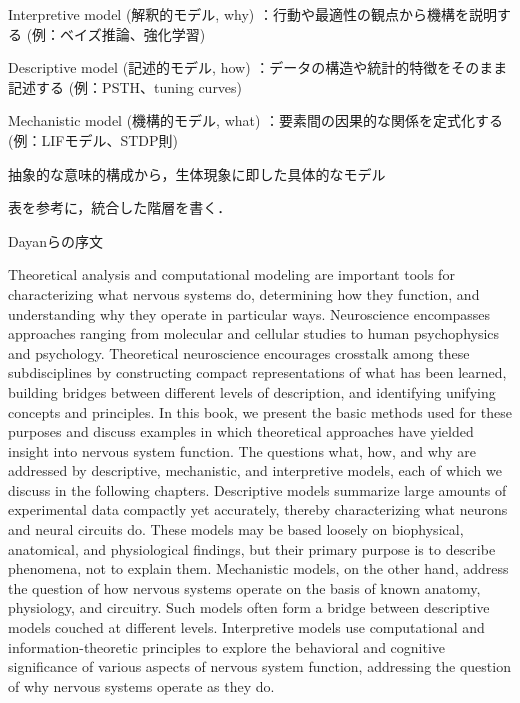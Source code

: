 \documentclass[titlepage]{ltjsbook}
\begin{document}
Interpretive model (解釈的モデル, why) ：行動や最適性の観点から機構を説明する (例：ベイズ推論、強化学習) 

Descriptive model (記述的モデル, how) ：データの構造や統計的特徴をそのまま記述する (例：PSTH、tuning curves) 

Mechanistic model (機構的モデル, what) ：要素間の因果的な関係を定式化する (例：LIFモデル、STDP則) 

抽象的な意味的構成から，生体現象に即した具体的なモデル



表を参考に，統合した階層を書く．



Dayanらの序文

Theoretical analysis and computational modeling are important tools for characterizing what nervous systems do, determining how they function, and understanding why they operate in particular ways. Neuroscience encompasses approaches ranging from molecular and cellular studies to human psychophysics and psychology. Theoretical neuroscience encourages crosstalk among these subdisciplines by constructing compact representations of what has been learned, building bridges between different levels of description, and identifying unifying concepts and principles. In this book, we present the basic methods used for these purposes and discuss examples in which theoretical approaches have yielded insight into nervous system function. The questions what, how, and why are addressed by descriptive, mechanistic, and interpretive models, each of which we discuss in the following chapters. Descriptive models summarize large amounts of experimental data compactly yet accurately, thereby characterizing what neurons and neural circuits do. These models may be based loosely on biophysical, anatomical, and physiological findings, but their primary purpose is to describe phenomena, not to explain them. Mechanistic models, on the other hand, address the question of how nervous systems operate on the basis of known anatomy, physiology, and circuitry. Such models often form a bridge between descriptive models couched at different levels. Interpretive models use computational and information-theoretic principles to explore the behavioral and cognitive significance of various aspects of nervous system function, addressing the question of why nervous systems operate as they do.
\end{document}
